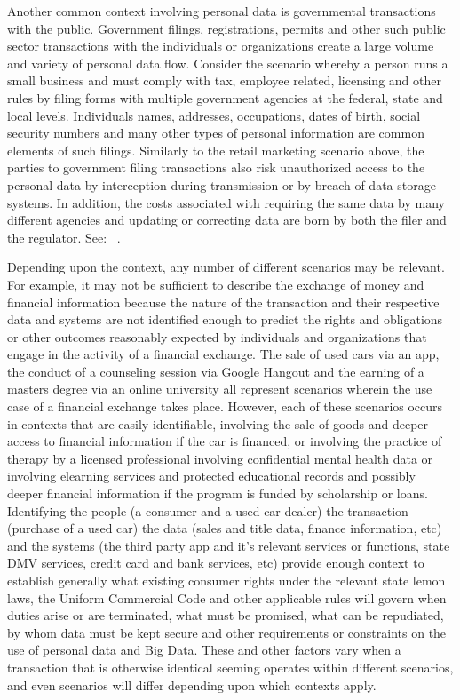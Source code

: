 Another common context involving personal data is governmental transactions with the public.  Government filings, registrations, permits and other such public sector transactions with the individuals or organizations create a large volume and variety of personal data flow.  Consider the scenario whereby a person runs a small business and must comply with tax, employee related, licensing and other rules by filing forms with multiple government agencies at the federal, state and local levels.  Individuals names, addresses, occupations, dates of birth, social security numbers and many other types of personal information are common elements of such filings.  Similarly to the retail marketing scenario above, the parties to government filing transactions also risk unauthorized access to the personal data by interception during transmission or by breach of data storage systems.   In addition, the costs associated with requiring the same data by many different agencies and updating or correcting data are born by both the filer and the regulator.  See: ~\cite{kbc2013}.

Depending upon the context, any number of different scenarios may be relevant.  For example, it may not be sufficient to describe the exchange of money and financial information because the nature of the transaction and their respective data and systems are not identified enough to predict the rights and obligations or other outcomes reasonably expected by individuals and organizations that engage in the activity of a financial exchange.  The sale of used cars via an app, the conduct of a counseling session via Google Hangout and the earning of a masters degree via an online university all represent scenarios wherein the use case of a financial exchange takes place.  However, each of these scenarios occurs in contexts that are easily identifiable, involving the sale of goods and deeper access to financial information if the car is financed, or involving the practice of therapy by a licensed professional involving confidential mental health data or involving elearning services and protected educational records and possibly deeper financial information if the program is funded by scholarship or loans.  Identifying the people (a consumer and a used car dealer) the transaction (purchase of a used car) the data (sales and title data, finance information, etc) and the systems (the third party app and it's relevant services or functions, state DMV services, credit card and bank services, etc) provide enough context to establish generally what existing consumer rights under the relevant state lemon laws, the Uniform Commercial Code and other applicable rules will govern when duties arise or are terminated, what must be promised, what can be repudiated, by whom data must be kept secure and other requirements or constraints on the use of personal data and Big Data. These and other factors vary when a transaction that is otherwise identical seeming operates within different scenarios, and even scenarios will differ depending upon which contexts apply.  







